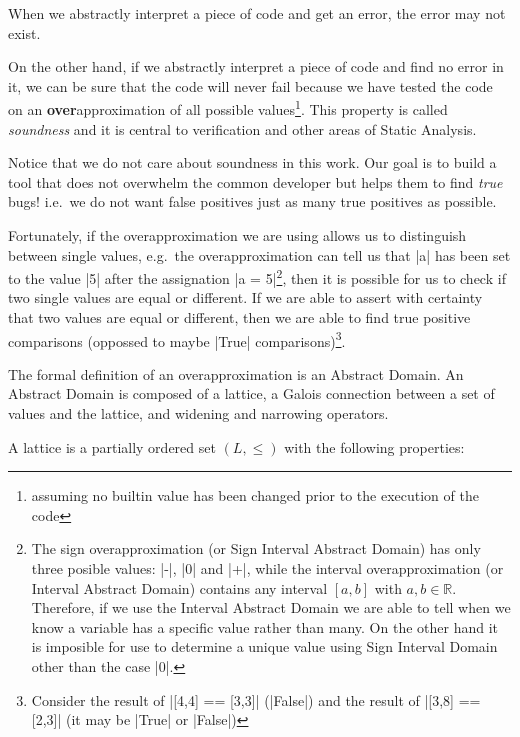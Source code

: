 When we abstractly interpret a piece of code and get an error, the error
may not exist.

On the other hand, if we abstractly interpret a piece of code and find
no error in it, we can be sure that the code will never fail because we
have tested the code on an \textbf{over}approximation of all possible
values\footnote{assuming no builtin value has been changed prior to the
  execution of the code}. This property is called \emph{soundness} and
it is central to verification and other areas of Static Analysis.

Notice that we do not care about soundness in this work. Our goal is to
build a tool that does not overwhelm the common developer but helps them
to find \emph{true} bugs! i.e.~we do not want false positives just as
many true positives as possible.

Fortunately, if the overapproximation we are using allows us to
distinguish between single values, e.g.~the overapproximation can tell
us that \pycode|a| has been set to the value \pycode|5| after the
assignation \pycode|a = 5|\footnote{The sign overapproximation (or
  Sign Interval Abstract Domain) has only three posible values:
  \pycode|-|, \pycode|0| and \pycode|+|, while the interval
  overapproximation (or Interval Abstract Domain) contains any interval
  \([a,b]\) with \(a,b \in \mathbb{R}\). Therefore, if we use the
  Interval Abstract Domain we are able to tell when we know a variable
  has a specific value rather than many. On the other hand it is
  imposible for use to determine a unique value using Sign Interval
  Domain other than the case \pycode|0|.}, then it is possible for us to
check if two single values are equal or different. If we are able to
assert with certainty that two values are equal or different, then we
are able to find true positive comparisons (oppossed to maybe
\pycode|True| comparisons)\footnote{Consider the result of
  \pycode|[4,4] == [3,3]| (\pycode|False|) and the result of
  \pycode|[3,8] == [2,3]| (it may be \pycode|True| or
  \pycode|False|)}.

The formal definition of an overapproximation is an Abstract Domain. An
Abstract Domain is composed of a lattice, a Galois connection between a
set of values and the lattice, and widening and narrowing operators.

A lattice is a partially ordered set \((L, \le)\) with the following
properties:

